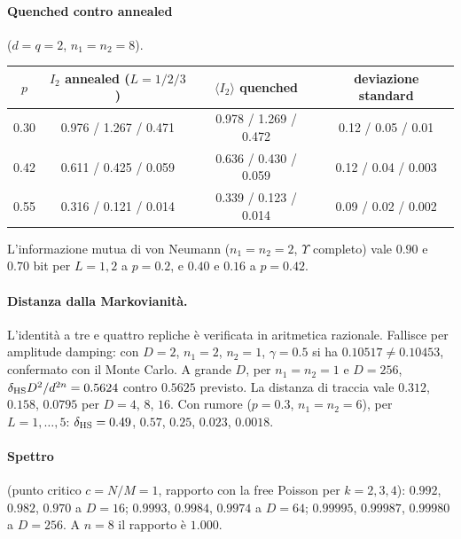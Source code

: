 \paragraph{Quenched contro annealed} ($d=q=2$, $n_1=n_2=8$).
\begin{center}\small
\begin{tabular}{@{}cccc@{}}
\toprule
$p$ & $I_2$ annealed ($L=1/2/3$) & $\langle I_2\rangle$ quenched & deviazione standard\\
\midrule
0.30 & 0.976 / 1.267 / 0.471 & 0.978 / 1.269 / 0.472 & 0.12 / 0.05 / 0.01\\
0.42 & 0.611 / 0.425 / 0.059 & 0.636 / 0.430 / 0.059 & 0.12 / 0.04 / 0.003\\
0.55 & 0.316 / 0.121 / 0.014 & 0.339 / 0.123 / 0.014 & 0.09 / 0.02 / 0.002\\
\bottomrule
\end{tabular}
\end{center}
L'informazione mutua di von Neumann ($n_1=n_2=2$, $\Upsilon$ completo) vale $0.90$ e $0.70$ bit per $L=1,2$ a $p=0.2$, e $0.40$ e $0.16$ a $p=0.42$.

\paragraph{Distanza dalla Markovianità.} L'identità a tre e quattro repliche è verificata in aritmetica razionale. Fallisce per amplitude damping: con $D=2$, $n_1=2$, $n_2=1$, $\gamma=0.5$ si ha $0.10517\neq0.10453$, confermato con il Monte Carlo. A grande $D$, per $n_1=n_2=1$ e $D=256$, $\delta_{\rm HS}D^2/d^{2n}=0.5624$ contro $0.5625$ previsto. La distanza di traccia vale $0.312$, $0.158$, $0.0795$ per $D=4$, $8$, $16$. Con rumore ($p=0.3$, $n_1=n_2=6$), per $L=1,\dots,5$: $\delta_{\rm HS}=0.49$, $0.57$, $0.25$, $0.023$, $0.0018$.

\paragraph{Spettro} (punto critico $c=N/M=1$, rapporto con la free Poisson per $k=2,3,4$): $0.992$, $0.982$, $0.970$ a $D=16$; $0.9993$, $0.9984$, $0.9974$ a $D=64$; $0.99995$, $0.99987$, $0.99980$ a $D=256$. A $n=8$ il rapporto è $1.000$.
